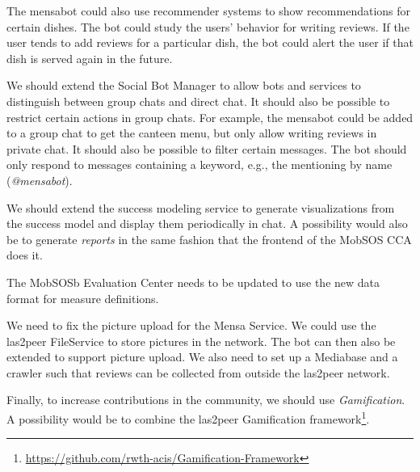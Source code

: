 The mensabot could also use recommender systems to show recommendations for certain dishes. The bot could study the users' behavior for writing reviews. If the user tends to add reviews for a particular dish, the bot could alert the user if that dish is served again in the future.

We should extend the Social Bot Manager to allow bots and services to distinguish between group chats and direct chat. It should also be possible to restrict certain actions in group chats. For example, the mensabot could be added to a group chat to get the canteen menu, but only allow writing reviews in private chat.
It should also be possible to filter certain messages. The bot should only respond to messages containing a keyword, e.g., the mentioning by name (\emph{@mensabot}).

We should extend the success modeling service to generate visualizations from the success model and display them periodically in chat. A possibility would also be to generate \emph{reports} in the same fashion that the frontend of the MobSOS CCA does it. 

The MobSOSb Evaluation Center needs to be updated to use the new data format for measure definitions.

We need to fix the picture upload for the Mensa Service. We could use the las2peer FileService to store pictures in the network. The bot can then also be extended to support picture upload. 
We also need to set up a Mediabase and a crawler such that reviews can be collected from outside the las2peer network. 

Finally, to increase contributions in the community, we should use \emph{Gamification}. A possibility would be to combine the las2peer Gamification framework\footnote{\url{https://github.com/rwth-acis/Gamification-Framework}}.
